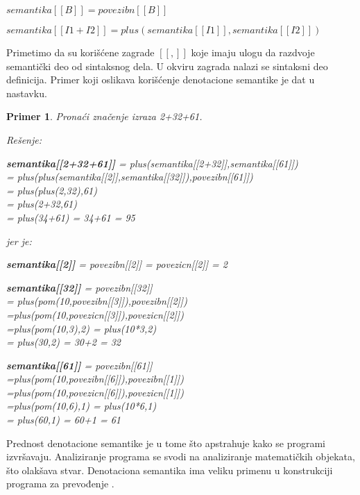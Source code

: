 \documentclass[a4paper]{article}
\newtheorem{primer}{Primer}[section]
\begin{document}
{\begin{tcolorbox}
$ semantika[[B]] = povezibn[[B]] $

$ semantika[[I1 + I2]] = plus(semantika[[I1]],semantika[[I2]]) $

\end{tcolorbox}
Primetimo da su korišćene zagrade $ [[,]]$ koje imaju ulogu da razdvoje semantički deo od sintaksnog dela. U okviru zagrada nalazi se sintaksni deo definicija. Primer koji oslikava korišćenje denotacione semantike je dat u nastavku.
\begin{primer}
Pronaći značenje izraza 2+32+61.

Rešenje:
\begin{center}
\textbf{semantika[[2+32+61]]} = plus(semantika[[2+32]],semantika[[61]])\\
= plus(plus(semantika[[2]],semantika[[32]]),povezibn[[61]])\\
= plus(plus(2,32),61)\\
= plus(2+32,61)\\
= plus(34+61) = 34+61 = 95
\end{center}

jer je:

\begin{center}
\textbf{semantika[[2]]} = povezibn[[2]] = povezicn[[2]] = 2
\end{center}
\begin{center}
\textbf{semantika[[32]]} = povezibn[[32]]\\
= plus(pom(10,povezibn[[3]]),povezibn[[2]])\\
=plus(pom(10,povezicn[[3]]),povezicn[[2]]) \\
=plus(pom(10,3),2) = plus(10*3,2)\\
= plus(30,2) = 30+2 = 32\end{center}

\begin{center}
\textbf{semantika[[61]]} = povezibn[[61]] \\
=plus(pom(10,povezibn[[6]]),povezibn[[1]])\\
=plus(pom(10,povezicn[[6]]),povezicn[[1]]) \\
=plus(pom(10,6),1) = plus(10*6,1)\\
= plus(60,1) = 60+1 = 61

\end{center}
\end{primer}

 Prednost denotacione semantike je u tome što apstrahuje kako se programi izvršavaju. Analiziranje programa se svodi na analiziranje matematičkih objekata, što olakšava stvar. Denotaciona semantika ima veliku primenu u konstrukciji programa za prevođenje \cite{parezanovic}.
}
\end{document}
